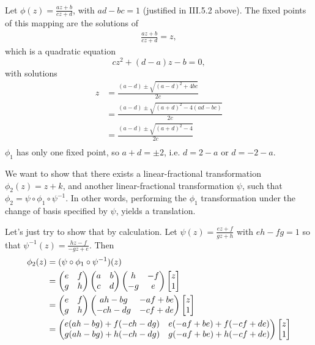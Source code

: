 \documentclass[12pt]{article}
\begin{document}
\begin{description}

  \\
  Let $\phi(z) = \frac{az + b}{cz + d}$, with $ad - bc = 1$ (justified in
  III.5.2 above). The fixed points of this mapping are the solutions of
  \begin{align*}
    \frac{az + b}{cz + d} = z,
  \end{align*}
  which is a quadratic equation
  $$
  cz^2 + (d - a)z - b = 0,
  $$
  with solutions
  \begin{align*}
  z &= \frac{(a - d) \pm \sqrt{(a - d)^2 + 4bc}}{2c} \\
    &= \frac{(a - d) \pm \sqrt{(a + d)^2 - 4(ad - bc)}}{2c} \\
    &= \frac{(a - d) \pm \sqrt{(a + d)^2 - 4}}{2c} \\
  \end{align*}
  $\phi_1$ has only one fixed point, so $a + d = \pm 2$, i.e. $d = 2 - a$ or $d = -2 - a$.

  We want to show that there exists a linear-fractional transformation $\phi_2(z) = z + k$,
  and another linear-fractional transformation $\psi$, such that
  $\phi_2 = \psi \circ \phi_1 \circ \psi^{-1}$. In other words, performing the
  $\phi_1$ transformation under the change of basis specified by $\psi$, yields
  a translation.

  Let's just try to show that by calculation. Let
  $\psi(z) = \frac{ez + f}{gz + h}$ with $eh - fg = 1$ so that
  $\psi^{-1}(z) = \frac{hz -f}{-gz + e}$. Then
  \begin{align*}
    \phi_2(z)
    &= (\psi \circ \phi_1 \circ \psi^{-1})(z) \\
    &= \begin{pmatrix}e & f\\g & h\\ \end{pmatrix} \begin{pmatrix}a & b\\c & d\\ \end{pmatrix} \begin{pmatrix}h  & -f\\-g & e \\ \end{pmatrix} \begin{bmatrix}z\\1\end{bmatrix} \\
    &= \begin{pmatrix}e & f\\g & h\\ \end{pmatrix} \begin{pmatrix} ah - bg & -af + be\\-ch - dg & -cf + de\\ \end{pmatrix} \begin{bmatrix}z\\1\end{bmatrix} \\
    &= \begin{pmatrix}e(ah - bg) + f(-ch - dg) & e(-af + be) + f(-cf + de)\\g(ah - bg) + h(-ch - dg) & g(-af + be) + h(-cf + de)\\ \end{pmatrix} \begin{bmatrix}z\\1\end{bmatrix} \\
  \end{align*}


\end{description}
\end{document}
